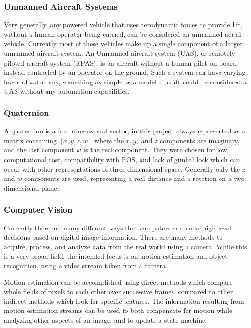 \documentclass{article}[12]
\begin{document}
		\subsubsection{Unmanned Aircraft Systems}
		
		Very generally, any powered vehicle that uses aerodynamic forces to provide lift, without a human operator being carried, can be considered an unmanned aerial vehicle. Currently most of these vehicles make up a single component of a larger unmanned aircraft system. An Unmanned aircraft system (UAS), or remotely piloted aircraft system (RPAS), is an aircraft without a human pilot on-board, instead controlled by an operator on the ground. Such a system can have varying levels of autonomy, something as simple as a model aircraft could be considered a UAS without any automation capabilities.\cite{RPAS}
		
		\subsubsection{Quaternion}
		
		A quaternion is a four dimensional vector, in this project always represented as a matrix containing $[x,y,z,w]$ where the $x,y,$ and $z$ components are imaginary, and the last component $w$ is the real component. They were chosen for low computational cost, compatibility with ROS, and lack of gimbal lock which can occur with other representations of three dimensional space. Generally only the $z$ and $w$ components are used, representing a real distance and a rotation on a two dimensional plane.
		
		\subsubsection{Computer Vision}
		
		Currently there are many different ways that computers can make high-level decisions based on digital image information. There are many methods to acquire, process, and analyze data from the real world using a camera. While this is a very broad field, the intended focus is on motion estimation and object recognition, using a video stream taken from a camera. 
		
		Motion estimation can be accomplished using direct methods which compare whole fields of pixels to each other over successive frames, compared to other indirect methods which look for specific features. The information resulting from motion estimation streams can be used to both compensate for motion while analyzing other aspects of an image, and to update a state machine.
		
\end{document}
